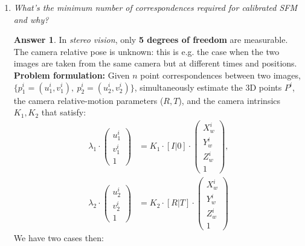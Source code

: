 \documentclass[a4paper,12 pt]{article}
\theoremstyle{definition}
\theoremstyle{remark}
\theoremstyle{definition}
\theoremstyle{definition}
\theoremstyle{definition}
\theoremstyle{definition}
\theoremstyle{remark}
\theoremstyle{remark}
\theoremstyle{definition}
\theoremstyle{definition}
\newtheorem*{answer}{Answer}
\begin{document}
\begin{enumerate}
\item \textit{What’s the minimum number of correspondences required for calibrated SFM and why?}
\begin{answer}
In \textit{stereo vision}, only \textbf{5 degrees of freedom} are measurable. The camera relative pose is unknown: this is e.g. the case when the two images are taken from the same camera but at different times and positions.\\
\textbf{Problem formulation:} Given $n$ point correspondences between two images, $\{p_1^i=(u_1^i,v_1^i), \ p_2^i=(u_2^i,v_2^i)\}$, simultaneously estimate the 3D points $P^i$, the camera relative-motion parameters ($R,T$), and the camera intrinsics $K_1,K_2$ that satisfy:
\begin{equation}
\begin{split}
\lambda_1 \cdot \begin{pmatrix}
 u_1^i\\
 v_1^i\\
 1
 \end{pmatrix}&=K_1\cdot [I|0]\cdot \begin{pmatrix}
 X_w^i\\
 Y_w^i\\
 Z_w^i\\
 1
 \end{pmatrix},\\
 \lambda_2 \cdot \begin{pmatrix}
 u_2^i\\
 v_2^i\\
 1
 \end{pmatrix}&=K_2\cdot [R|T]\cdot \begin{pmatrix}
 X_w^i\\
 Y_w^i\\
 Z_w^i\\
 1
 \end{pmatrix}
\end{split}
\end{equation}
We have two cases then:

\end{answer}
\end{enumerate}
\end{document}
